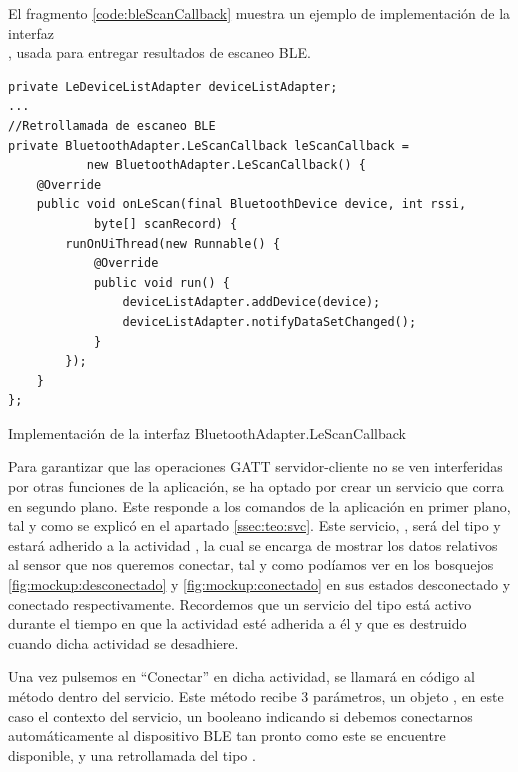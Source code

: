 El fragmento \ref{code:bleScanCallback} muestra un ejemplo de implementación de la interfaz \\ , usada para entregar resultados de escaneo BLE.

\begin{listing}[h] 
\begin{verbatim}
private LeDeviceListAdapter deviceListAdapter;
...
//Retrollamada de escaneo BLE
private BluetoothAdapter.LeScanCallback leScanCallback =
           new BluetoothAdapter.LeScanCallback() {
    @Override
    public void onLeScan(final BluetoothDevice device, int rssi,
            byte[] scanRecord) {
        runOnUiThread(new Runnable() {
            @Override
            public void run() {
                deviceListAdapter.addDevice(device);
                deviceListAdapter.notifyDataSetChanged();
            }
        });
    }
};		
\end{verbatim}
\caption{Implementación de la interfaz BluetoothAdapter.LeScanCallback}
\label{code:bleScanCallback}
\end{listing}
Para garantizar que las operaciones GATT servidor-cliente no se ven interferidas por otras funciones de la aplicación, se ha optado por crear un servicio que corra en segundo plano. Este responde a los comandos de la aplicación en primer plano, tal y como se explicó en el apartado \ref{ssec:teo:svc}.
Este servicio, , será del tipo  y estará adherido a la actividad , la cual se encarga de mostrar los datos relativos al sensor que nos queremos conectar, tal y como podíamos ver en los bosquejos \ref{fig:mockup:desconectado} y \ref{fig:mockup:conectado} en sus estados desconectado y conectado respectivamente.
Recordemos que un servicio del tipo  está activo durante el tiempo en que la actividad  esté adherida a él y que es destruido cuando dicha actividad se desadhiere.

Una vez pulsemos en ``Conectar'' en dicha actividad, se llamará en código al método  dentro del servicio. Este método recibe 3 parámetros, un objeto , en este caso el contexto del servicio, un booleano indicando si debemos conectarnos automáticamente al dispositivo BLE tan pronto como este se encuentre disponible, y una retrollamada del tipo . \\


